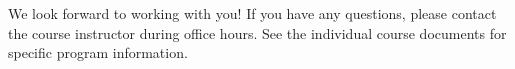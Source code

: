 We look forward to working with you! If you have any questions, please contact the course instructor
during office hours. See the individual course documents for specific program information.
